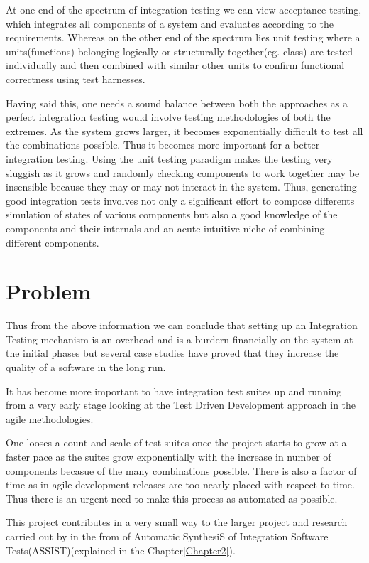 At one end of the spectrum of integration testing we can view acceptance testing, which integrates all components of a system and evaluates according to the requirements. Whereas on the other end of the spectrum lies unit testing where a units(functions) belonging logically or structurally together(eg. class) are tested individually and then combined with similar other units to confirm functional correctness using test harnesses.

Having said this, one needs a sound balance between both the approaches as a perfect integration testing would involve testing methodologies of both the extremes. As the system grows larger, it becomes exponentially difficult to test all the combinations possible. Thus it becomes more important for a better integration testing. Using the unit testing paradigm makes the testing very sluggish as it grows and randomly checking components to work together may be insensible because they may or may not interact in the system. Thus, generating good integration tests involves not only a significant effort to compose differents simulation of states of various components but also a good knowledge of the components and their internals and an acute intuitive niche of combining different components.


\section{Problem}

Thus from the above information we can conclude that setting up an Integration Testing mechanism is an overhead and is a burdern financially on the system at the initial phases but several case studies have proved that they increase the quality of a software in the long run.

It has become more important to have integration test suites up and running from a very early stage looking at the Test Driven Development approach in the agile methodologies.

One looses a count and scale of test suites once the project starts to grow at a faster pace as the suites grow exponentially with the increase in number of components becasue of the many combinations possible. There is also a factor of time as in agile development releases are too nearly placed with respect to time. Thus there is an urgent need to make this process as automated as possible.

This project contributes in a very small way to the larger project and research carried out by \href{http://www.cs.uic.edu/~drmark/}{\supname} in the from of Automatic SynthesiS of Integration Software Tests(ASSIST)(explained in the Chapter\ref{Chapter2}).
